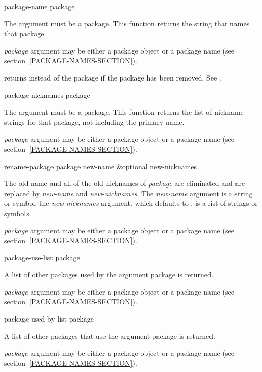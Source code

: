 \begin{defun}[Function]
package-name package

The argument must be a package.  This function returns the string that
names that package.

\emph{package} argument may be either a package object
or a package name (see section~\ref{PACKAGE-NAMES-SECTION}).

 returns  instead of the package if the package has been
removed. See .
\end{defun}

\begin{defun}[Function]
package-nicknames package

The argument must be a package.  This function returns the list of
nickname strings for that package, not including the primary name.

\emph{package} argument may be either a package object
or a package name (see section~\ref{PACKAGE-NAMES-SECTION}).
\end{defun}

\begin{defun}[Function]
rename-package package new-name &optional new-nicknames

The old name and all of the old nicknames of \emph{package} are eliminated
and are replaced by \emph{new-name} and \emph{new-nicknames}.  The
\emph{new-name} argument is a string or symbol; the \emph{new-nicknames}
argument, which defaults to {\false}, is a list of strings or symbols.

\emph{package} argument may be either a package object
or a package name (see section~\ref{PACKAGE-NAMES-SECTION}).
\end{defun}

\begin{defun}[Function]
package-use-list package

A list of other packages used by the argument package is returned.

\emph{package} argument may be either a package object
or a package name (see section~\ref{PACKAGE-NAMES-SECTION}).
\end{defun}

\begin{defun}[Function]
package-used-by-list package

A list of other packages that use the argument package is returned.

\emph{package} argument may be either a package object
or a package name (see section~\ref{PACKAGE-NAMES-SECTION}).
\end{defun}

